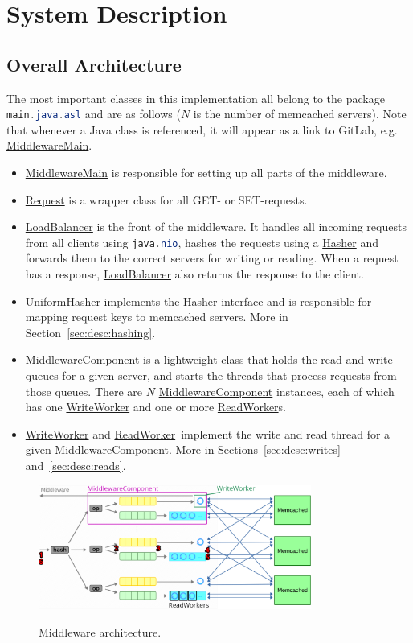 \documentclass[11pt]{article}
\newcommand{\code}[1]{\lstinline[language=Java]{#1}}
\newcommand{\linkmain}[1]{\href{https://gitlab.inf.ethz.ch/pungast/asl-fall16-project/blob/master/src/main/java/asl/#1.java}{#1}}
\begin{document}
\section{System Description}\label{sec:system-description}

\subsection{Overall Architecture}\label{sec:desc:architecture}

The most important classes in this implementation all belong to the package \code{main.java.asl} and are as follows ($N$ is the number of memcached servers). Note that whenever a Java class is referenced, it will appear as a link to GitLab, e.g. \linkmain{MiddlewareMain}. 

\begin{itemize}
\item \linkmain{MiddlewareMain} is responsible for setting up all parts of the middleware.
\item \linkmain{Request} is a wrapper class for all GET- or SET-requests.
\item \linkmain{LoadBalancer} is the front of the middleware. It handles all incoming requests from all clients using \code{java.nio}, hashes the requests using a \linkmain{Hasher} and forwards them to the correct servers for writing or reading. When a request has a response, \linkmain{LoadBalancer} also returns the response to the client.
\item \linkmain{UniformHasher} implements the \linkmain{Hasher} interface and is responsible for mapping request keys to memcached servers. More in Section~\ref{sec:desc:hashing}.
\item \linkmain{MiddlewareComponent} is a lightweight class that holds the read and write queues for a given server, and starts the threads that process requests from those queues. There are $N$ \linkmain{MiddlewareComponent} instances, each of which has one \linkmain{WriteWorker} and one or more \linkmain{ReadWorker}s.
\item \linkmain{WriteWorker} and \linkmain{ReadWorker} implement the write and read thread for a given \linkmain{MiddlewareComponent}. More in Sections~\ref{sec:desc:writes} and~\ref{sec:desc:reads}.
\end{itemize}

\begin{figure}[h]
\caption{Middleware architecture.}
\centering
\includegraphics[width=0.8\textwidth]{figures/structure.png}
\label{fig:structure}
\end{figure}
\end{document}
